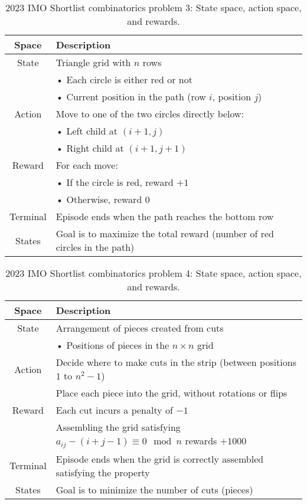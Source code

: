 \begin{table}[htb]
\caption{2023 IMO Shortlist combinatorics problem 3: State space, action space, and rewards.}
  \centering
  \small
\begin{tabular}{cl}
  \toprule
Space    & Description \\
\midrule
State    & Triangle grid with $n$ rows \\
         & • Each circle is either red or not \\
         & • Current position in the path (row $i$, position $j$) \\
Action   & Move to one of the two circles directly below: \\
         & • Left child at $(i+1, j)$ \\
         & • Right child at $(i+1, j+1)$ \\
Reward   & For each move: \\
         & • If the circle is red, reward $+1$ \\
         & • Otherwise, reward $0$ \\
Terminal & Episode ends when the path reaches the bottom row \\
States   & Goal is to maximize the total reward (number of red circles in the path) \\
\bottomrule
\end{tabular}
\end{table}

\begin{table}[htb]
\caption{2023 IMO Shortlist combinatorics problem 4: State space, action space, and rewards.}
  \centering
  \small
\begin{tabular}{cl}
  \toprule
Space    & Description \\
\midrule
State    & Arrangement of pieces created from cuts \\
         & • Positions of pieces in the $n \times n$ grid \\
Action   & Decide where to make cuts in the strip (between positions $1$ to $n^2 -1$) \\
         & Place each piece into the grid, without rotations or flips \\
Reward   & Each cut incurs a penalty of $-1$ \\
         & Assembling the grid satisfying $a_{ij} - (i+j-1) \equiv 0 \mod n$ rewards $+1000$ \\
Terminal & Episode ends when the grid is correctly assembled satisfying the property \\
States   & Goal is to minimize the number of cuts (pieces) \\
\bottomrule
\end{tabular}
\end{table}






